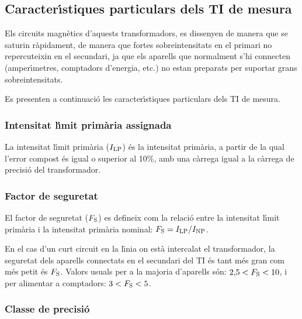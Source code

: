 \subsection{Caracter\'{\i}stiques particulars dels TI de mesura}

Els circuits magn\`{e}tics d'aquests transformadors, es dissenyen de
manera que se saturin r\`{a}pidament, de manera que fortes
sobreintensitats en el primari  no repercuteixin en el secundari,
ja que els aparells que normalment s'hi connecten (amper\'{\i}metres,
comptadors d'energia, etc.) no estan preparats per suportar grans
sobreintensitats.

Es presenten a continuaci\'{o} les caracter\'{\i}stiques particulars dels TI
de mesura.

\subsubsection{Intensitat l\'{\i}mit prim\`{a}ria  assignada}

 La intensitat l\'{\i}mit prim\`{a}ria
($I_\mathrm{LP}$) \'{e}s la intensitat prim\`{a}ria, a partir de la qual l'error compost \'{e}s igual
o superior al 10\unit{\%}, amb una c\`{a}rrega igual a la c\`{a}rrega de
precisi\'{o} del transformador.

\subsubsection{Factor de seguretat}

 El factor de seguretat
($F_\mathrm{S}$) es defineix com la relaci\'{o} entre la intensitat l\'{\i}mit prim\`{a}ria
i la intensitat prim\`{a}ria nominal: $F_\mathrm{S} = I_\mathrm{LP} / I_\mathrm{NP}$.

En el cas d'un curt circuit en la l\'{\i}nia on est\`{a} intercalat el
transformador, la seguretat dels aparells connectats en el secundari
del TI \'{e}s tant m\'{e}s gran com m\'{e}s petit \'{e}s  $F_\mathrm{S}$. Valors usuals
per a la majoria d'aparells s\'{o}n:  $2{,}5<F_\mathrm{S}<10$, i per
alimentar a comptadors: $3<F_\mathrm{S}<5$.

\subsubsection{Classe de precisi\'{o}}

